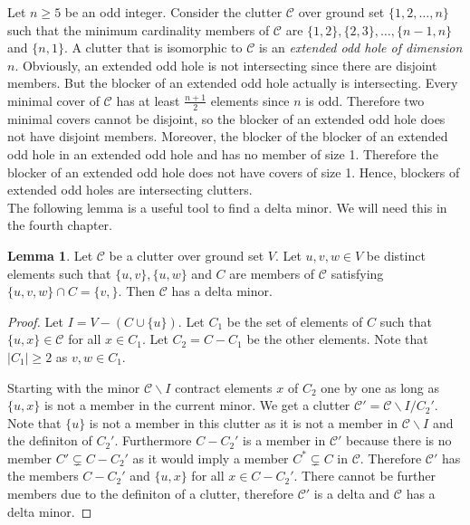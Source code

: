 \documentclass[a4paper, 12pt]{scrbook}
\theoremstyle{definition}
\newtheorem{lemma}[theorem]{Lemma}
\begin{document}
Let $n\geq 5$ be an odd integer.
Consider the clutter $\mathcal{C}$ over ground set $\{1,2,\ldots,n\}$ such that the minimum cardinality members of $\mathcal{C}$ are $\{1,2\},\{2,3\},\ldots,\{n-1,n\}$ and $\{n,1\}$.
A clutter that is isomorphic to $\mathcal{C}$ is an \emph{extended odd hole of dimension $n$}\cite{deltas}.
Obviously, an extended odd hole is not intersecting since there are disjoint members.
But the blocker of an extended odd hole actually is intersecting.
Every minimal cover of $\mathcal{C}$ has at least $\frac{n+1}2$ elements since $n$ is odd.
Therefore two minimal covers cannot be disjoint, so the blocker of an extended odd hole does not have disjoint members.
Moreover, the blocker of the blocker of an extended odd hole in an extended odd hole and has no member of size 1.
Therefore the blocker of an extended odd hole does not have covers of size 1.
Hence, blockers of extended odd holes are intersecting clutters.\\

The following lemma is a useful tool to find a delta minor. We will need this in the fourth chapter.
\begin{lemma}
    Let $\mathcal{C}$ be a clutter over ground set $V$. Let $u,v,w \in V$ be distinct elements such that $\{u,v\}, \{u,w\}$ and $C$ are members of $\mathcal{C}$ satisfying $\{u,v,w\}\cap C = \{v,\}$. Then $\mathcal{C}$ has a delta minor.
\end{lemma}

\begin{proof}\label{finddelta}
    Let $I=V-(C \cup \{u\})$. Let $C_1$ be the set of elements of $C$ such that $\{u,x\} \in \mathcal{C}$ for all $x \in C_1$. Let $C_2=C-C_1$ be the other elements. Note that $|C_1|\geq 2$ as $v,w \in C_1$.

    Starting with the minor $\mathcal{C} \backslash I$ contract elements $x$ of $C_2$ one by one as long as $\{u,x\}$ is not a member in the current minor.
    We get a clutter $\mathcal{C'}=\mathcal{C} \backslash I/C_2'$.
    Note that $\{u\}$ is not a member in this clutter as it is not a member in $\mathcal{C} \backslash I$ and the definiton of $C_2'$.
    Furthermore $C-C_2'$ is a member in $\mathcal{C'}$ because there is no member $C' \subsetneq C-C_2'$ as it would imply a member $C^* \subsetneq C$ in $\mathcal{C}$.
    Therefore $\mathcal{C'}$ has the members $C-C_2'$ and $\{u,x\}$ for all $x \in C-C_2'$. There cannot be further members due to the definiton of a clutter, therefore $\mathcal{C'}$ is a delta and $\mathcal{C}$ has a delta minor.

\end{proof}
\end{document}
